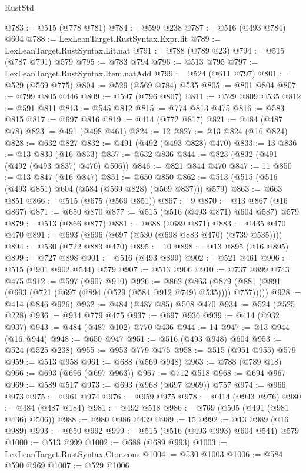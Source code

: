 \begin{lexlean}{RustStd}
\begin{coremodule}
@783 := @515 (@778 @781)
@784 := @599 @238
@787 := @516 (@493 @784) @604
@788 := LexLeanTarget.RustSyntax.Expr.lit
@789 := LexLeanTarget.RustSyntax.Lit.nat
@791 := @788 (@789 @23)
@794 := @515 (@787 @791) @579
@795 := @783 @794
@796 := @513 @795
@797 := LexLeanTarget.RustSyntax.Item.natAdd
@799 := @524 (@611 @797)
@801 := @529 (@569 @775)
@804 := @529 (@569 @784) @535
@805 := @801 @804
@807 := @799 @805 @446
@809 := @597 (@796 @807)
@811 := @529 @809 @535
@812 := @591 @811
@813 := @545 @812
@815 := @774 @813 @475
@816 := @583 @815
@817 := @697 @816
@819 := @414 (@772 @817)
@821 := @484 (@487 @78)
@823 := @491 (@498 @461)
@824 := 12
@827 := @13 @824 (@16 @824)
@828 := @632 @827
@832 := @491 (@492 (@493 @828) @470)
@833 := 13
@836 := @13 @833 (@16 @833)
@837 := @632 @836
@844 := @823 (@832 (@491 (@492 (@493 @837) @470) @506))
@846 := @821 @844 @470
@847 := 11
@850 := @13 @847 (@16 @847)
@851 := @650 @850
@862 := @513 (@515 (@516 (@493 @851) @604 (@584 (@569 @828) (@569 @837))) @579)
@863 := @663 @851
@866 := @515 (@675 (@569 @851))
@867 := 9
@870 := @13 @867 (@16 @867)
@871 := @650 @870
@877 := @515 (@516 (@493 @871) @604 @587) @579
@879 := @513 (@866 @877)
@881 := @688 (@689 @871)
@883 := @435 @470 @470
@891 := @693 (@696 (@697 (@530 (@698 @883 @470) (@739 @535))))
@894 := @530 (@722 @883 @470)
@895 := 10
@898 := @13 @895 (@16 @895)
@899 := @727 @898
@901 := @516 (@493 @899)
@902 := @521 @461
@906 := @515 (@901 @902 @544) @579
@907 := @513 @906
@910 := @737 @899 @743 @475
@912 := @597 (@907 @910)
@926 := @862
    (@863 (@879 (@881 (@891 (@693 (@721 (@697 (@894 (@529 (@584 @912 @749) @535)))) @757)))))
@928 := @414 (@846 @926)
@932 := @484 (@487 @85) @508 @470
@934 := @524 (@525 @228)
@936 := @934 @779 @475
@937 := @697 @936
@939 := @414 (@932 @937)
@943 := @484 (@487 @102) @770 @436
@944 := 14
@947 := @13 @944 (@16 @944)
@948 := @650 @947
@951 := @516 (@493 @948) @604
@953 := @524 (@525 @238)
@955 := @953 @779 @475
@958 := @515 (@951 @955) @579
@959 := @513 @958
@961 := @688 (@569 @948)
@963 := @788 (@789 @18)
@966 := @693 (@696 (@697 @963))
@967 := @712 @518
@968 := @694 @967
@969 := @589 @517
@973 := @693 (@968 (@697 @969)) @757
@974 := @966 @973
@975 := @961 @974
@976 := @959 @975
@978 := @414 (@943 @976)
@980 := @484 (@487 @184)
@981 := @492 @518
@986 := @769 (@505 (@491 (@981 @436) @506))
@988 := @980 @986 @439
@989 := 15
@992 := @13 @989 (@16 @989)
@993 := @650 @992
@999 := @515 (@516 (@493 @993) @604 @544) @579
@1000 := @513 @999
@1002 := @688 (@689 @993)
@1003 := LexLeanTarget.RustSyntax.Ctor.cons
@1004 := @530 @1003
@1006 := @584 @590 @969
@1007 := @529 @1006

\end{coremodule}
\end{lexlean}
